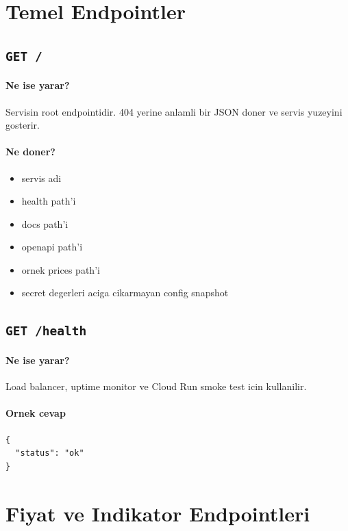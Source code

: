 \documentclass[11pt,a4paper]{article}
\begin{document}
\section{Temel Endpointler}

\subsection{\texttt{GET /}}

\paragraph{Ne ise yarar?}
Servisin root endpointidir. 404 yerine anlamli bir JSON doner ve servis yuzeyini gosterir.

\paragraph{Ne doner?}
\begin{itemize}[leftmargin=1.5em]
    \item servis adi
    \item health path'i
    \item docs path'i
    \item openapi path'i
    \item ornek prices path'i
    \item secret degerleri aciga cikarmayan config snapshot
\end{itemize}

\subsection{\texttt{GET /health}}

\paragraph{Ne ise yarar?}
Load balancer, uptime monitor ve Cloud Run smoke test icin kullanilir.

\paragraph{Ornek cevap}
\begin{lstlisting}
{
  "status": "ok"
}
\end{lstlisting}

\section{Fiyat ve Indikator Endpointleri}
\end{document}

